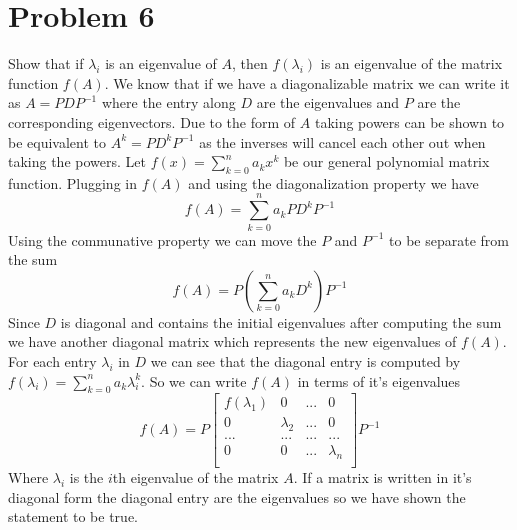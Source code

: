\documentclass{article}
\begin{document}
\section*{Problem 6}
Show that if $\lambda_i$ is an eigenvalue of $A$, then $f(\lambda_i)$ is an eigenvalue of the matrix function $f(A)$.
\newline
\newline
We know that if we have a diagonalizable matrix we can write it as $A = PDP^{-1}$ where the entry along $D$ are the eigenvalues and $P$ are the corresponding eigenvectors.
Due to the form of $A$ taking powers can be shown to be equivalent to $A^k = PD^kP^{-1}$ as the inverses will cancel each other out when taking the powers.
Let $f(x) = \sum_{k=0}^n a_k x^k$ be our general polynomial matrix function.
Plugging in $f(A)$ and using the diagonalization property we have
$$ f(A) = \sum_{k=0}^n a_k PD^kP^{-1} $$
Using the communative property we can move the $P$ and $P^{-1}$ to be separate from the sum
$$ f(A) = P(\sum_{k=0}^n a_k D^k)P^{-1} $$
Since $D$ is diagonal and contains the initial eigenvalues after computing the sum we have another diagonal matrix which represents the new eigenvalues of $f(A)$.
For each entry $\lambda_i$ in $D$ we can see that the diagonal entry is computed by $f(\lambda_i) = \sum_{k=0}^n a_k \lambda_i^k$.
So we can write $f(A)$ in terms of it's eigenvalues
$$ f(A) = P
\begin{bmatrix}
f(\lambda_1) & 0  & ... & 0 \\
0 & \lambda_2 & ... & 0 \\
... & ... & ... & ... \\
0 & 0 & ... & \lambda_n \\
\end{bmatrix}
P^{-1}
$$
Where $\lambda_i$ is the $i$th eigenvalue of the matrix $A$.
\newline
\newline
If a matrix is written in it's diagonal form the diagonal entry are the eigenvalues so we have shown the statement to be true.
\end{document}
